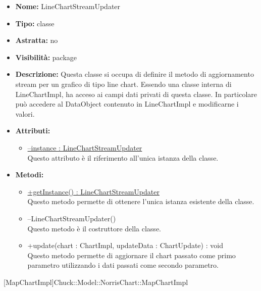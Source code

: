 			
			\begin{itemize}
			\item \textbf{Nome:} LineChartStreamUpdater
			\item \textbf{Tipo:} classe
			
		\item \textbf{Astratta:}
		no
			\item \textbf{Visibilità:} package
			\item \textbf{Descrizione:} Questa classe si occupa di definire il metodo di aggiornamento stream per un grafico di tipo line chart. Essendo una classe interna di LineChartImpl, ha acceso ai campi dati privati di questa classe. In particolare può accedere al DataObject contenuto in LineChartImpl e modificarne i valori.
			\item \textbf{Attributi:}
				\begin{itemize}
				\setlength{\itemsep}{5pt}
				
					\item[\ding{111}] \underline{--instance : LineChartStreamUpdater} \\ [1mm] Questo attributo è il riferimento all'unica istanza della classe.
				\end{itemize}
		
			\item \textbf{Metodi:}
				\begin{itemize}
				\setlength{\itemsep}{5pt}
				
					\item[\ding{111}] {\underline{+getInstance() : LineChartStreamUpdater}} \\ [1mm] Questo metodo permette di ottenere l'unica istanza esistente della classe.
					\item[\ding{111}] {{--LineChartStreamUpdater()}} \\ [1mm] Questo metodo è il costruttore della classe.
					\item[\ding{111}] {{+update(chart : ChartImpl, updateData : ChartUpdate) : void}} \\ [1mm] Questo metodo permette di aggiornare il chart passato come primo parametro utilizzando i dati passati come secondo parametro.
				\end{itemize}
		
			\end{itemize}

			
			[MapChartImpl]{Chuck::Model::NorrisChart::MapChartImpl}
			

